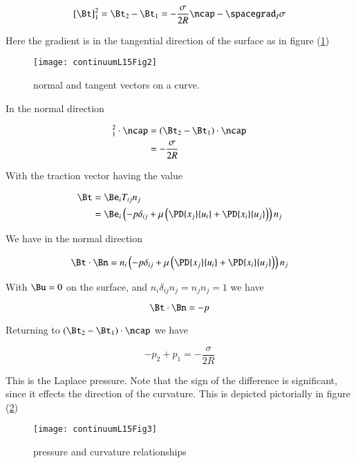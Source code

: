 \begin{equation}\label{eqn:inclinedFlowWithoutConstantHeightAssumption:130}
[\Bt]_1^2 = \Bt_2 - \Bt_1 = -\frac{\sigma}{2 R} \ncap - \spacegrad_I \sigma
\end{equation}

Here the gradient is in the tangential direction of the surface as in figure (\ref{fig:continuumL15:continuumL15Fig2})
\begin{figure}[htp]
   \centering
   \texttt{[image: continuumL15Fig2]}
   \caption{normal and tangent vectors on a curve.}\label{fig:continuumL15:continuumL15Fig2}
\end{figure}

In the normal direction

\begin{align*}
[\Bt]_1^2 \cdot \ncap
&= (\Bt_2 - \Bt_1) \cdot \ncap \\
&= -\frac{\sigma}{2 R} 
\end{align*}

With the traction vector having the value

\begin{align*}
\Bt 
&= \Be_i T_{ij} n_j \\
&= 
\Be_i \left( 
-p \delta_{ij} + \mu \left( 
\PD{x_j}{u_i}
+\PD{x_i}{u_j}
\right)
\right)
n_j
\end{align*}

We have in the normal direction

\begin{equation}\label{eqn:inclinedFlowWithoutConstantHeightAssumption:10}
\Bt \cdot \Bn 
=
n_i \left( 
-p \delta_{ij} + \mu \left( 
\PD{x_j}{u_i}
+\PD{x_i}{u_j}
\right)
\right) n_j
\end{equation}

With $\Bu = 0$ on the surface, and $n_i \delta_{ij} n_j = n_j n_j = 1$ we have

\begin{equation}\label{eqn:inclinedFlowWithoutConstantHeightAssumption:30}
\Bt \cdot \Bn = -p
\end{equation}

Returning to $(\Bt_2 - \Bt_1) \cdot \ncap$ we have

\begin{equation}\label{eqn:inclinedFlowWithoutConstantHeightAssumption:50}
\boxed{
-p_2 + p_1 = -\frac{\sigma}{2 R} 
}
\end{equation}

This is the Laplace pressure.  Note that the sign of the difference is significant, since it effects the direction of the curvature.  This is depicted pictorially in figure (\ref{fig:continuumL15:continuumL15Fig3})
\begin{figure}[htp]
   \centering
   \texttt{[image: continuumL15Fig3]}
   \caption{pressure and curvature relationships}\label{fig:continuumL15:continuumL15Fig3}
\end{figure}

